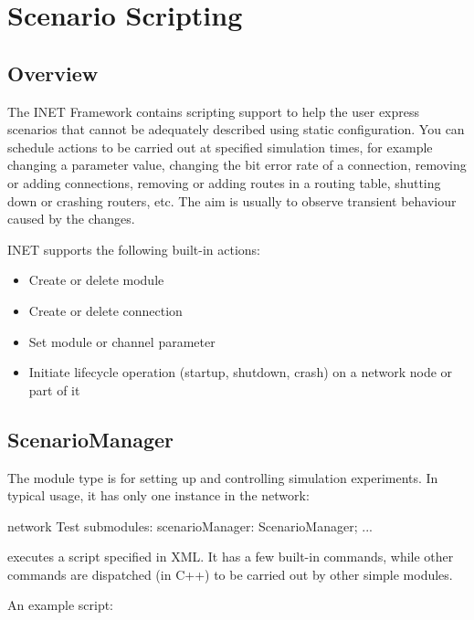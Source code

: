 \chapter{Scenario Scripting}
\label{cha:scenario-scripting}

\section{Overview}
\label{sec:scenario:overview}

The INET Framework contains scripting support to help the user express
scenarios that cannot be adequately described using static configuration.
You can schedule actions to be carried out at specified simulation times,
for example changing a parameter value, changing the bit error rate of
a connection, removing or adding connections, removing or adding
routes in a routing table, shutting down or crashing routers, etc.
The aim is usually to observe transient behaviour caused by the changes.

INET supports the following built-in actions:

\begin{itemize}
  \item Create or delete module
  \item Create or delete connection
  \item Set module or channel parameter
  \item Initiate lifecycle operation (startup, shutdown, crash)
    on a network node or part of it
\end{itemize}

\section{ScenarioManager}
\label{sec:scenario:scenariomanager}

The  module type is for setting up and controlling
simulation experiments. In typical usage, it has only one instance in the
network:

\begin{ned}
network Test {
    submodules:
        scenarioManager: ScenarioManager;
        ...
}
\end{ned}

 executes a script specified in XML. It has a few
built-in commands, while other commands are dispatched (in C++) to be
carried out by other simple modules.

An example script:

